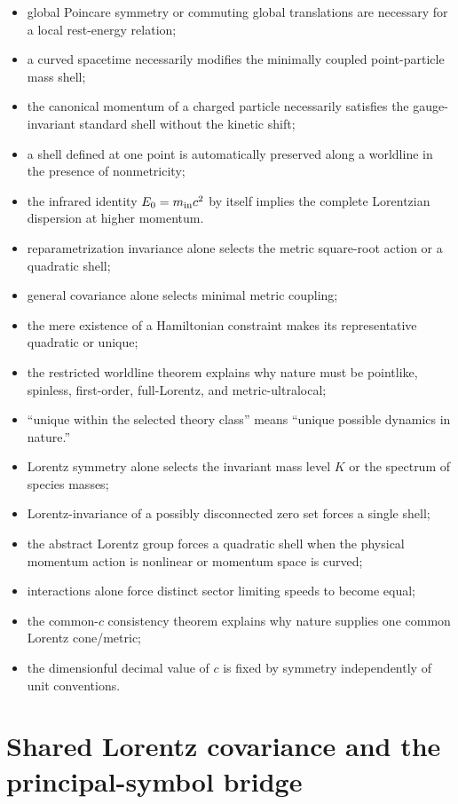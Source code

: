 \documentclass[11pt,a4paper]{article}
\begin{document}
\begin{itemize}
\item global Poincare symmetry or commuting global translations are necessary for a local rest-energy relation;
\item a curved spacetime necessarily modifies the minimally coupled point-particle mass shell;
\item the canonical momentum of a charged particle necessarily satisfies the gauge-invariant standard shell without the kinetic shift;
\item a shell defined at one point is automatically preserved along a worldline in the presence of nonmetricity;
\item the infrared identity $E_0=m_{\rm in}c^2$ by itself implies the complete Lorentzian dispersion at higher momentum.
\item reparametrization invariance alone selects the metric square-root action or a quadratic shell;
\item general covariance alone selects minimal metric coupling;
\item the mere existence of a Hamiltonian constraint makes its representative quadratic or unique;
\item the restricted worldline theorem explains why nature must be pointlike, spinless, first-order, full-Lorentz, and metric-ultralocal;
\item ``unique within the selected theory class'' means ``unique possible dynamics in nature.''
\item Lorentz symmetry alone selects the invariant mass level $K$ or the spectrum of species masses;
\item Lorentz-invariance of a possibly disconnected zero set forces a single shell;
\item the abstract Lorentz group forces a quadratic shell when the physical momentum action is nonlinear or momentum space is curved;
\item interactions alone force distinct sector limiting speeds to become equal;
\item the common-$c$ consistency theorem explains why nature supplies one common Lorentz cone/metric;
\item the dimensionful decimal value of $c$ is fixed by symmetry independently of unit conventions.
\end{itemize}



\section{Shared Lorentz covariance and the principal-symbol bridge}
\label{sec:principal-symbol}
\end{document}
